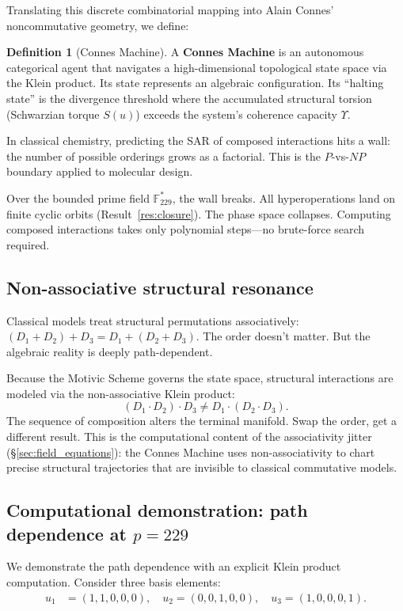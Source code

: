 \documentclass[12pt,oneside]{article}
\theoremstyle{principia}
\theoremstyle{definition}
\newtheorem{definition}[theorem]{Definition}
\theoremstyle{remark}
\begin{document}
Translating this discrete combinatorial mapping into Alain Connes' noncommutative geometry, we define:

\begin{definition}[Connes Machine]
A \textbf{Connes Machine} is an autonomous categorical agent
that navigates a high-dimensional topological state space via
the Klein product. Its state represents an algebraic configuration.
Its ``halting state'' is the divergence threshold where the
accumulated structural torsion (Schwarzian torque $S(u)$) exceeds
the system's coherence capacity $\Upsilon$.
\end{definition}

In classical chemistry, predicting the SAR of composed interactions hits a wall: the number of possible orderings grows as a factorial. This is the $P$-vs-$NP$ boundary applied to molecular design.

Over the bounded prime field $\mathbb{F}_{229}^*$, the wall breaks. All hyperoperations land on finite cyclic orbits (Result~\ref{res:closure}). The phase space collapses. Computing composed interactions takes only polynomial steps---no brute-force search required.

\subsection{Non-associative structural resonance}

Classical models treat structural permutations associatively: $(D_1 + D_2) + D_3 = D_1 + (D_2 + D_3)$. The order doesn't matter. But the algebraic reality is deeply path-dependent.

Because the Motivic Scheme governs the state space, structural interactions are modeled via the non-associative Klein product:
\[
(D_1 \cdot D_2) \cdot D_3 \neq D_1 \cdot (D_2 \cdot D_3).
\]
The sequence of composition alters the terminal manifold. Swap the order, get a different result. This is the computational content of the associativity jitter (\S\ref{sec:field_equations}): the Connes Machine uses non-associativity to chart precise structural trajectories that are invisible to classical commutative models.

\subsection{Computational demonstration: path dependence
at $p = 229$}

We demonstrate the path dependence with an explicit Klein product
computation. Consider three basis elements:
\begin{align}
u_1 &= (1, 1, 0, 0, 0), \quad
u_2 = (0, 0, 1, 0, 0), \quad
u_3 = (1, 0, 0, 0, 1).
\end{align}
\end{document}
